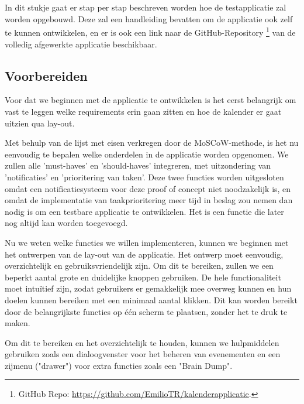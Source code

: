 \chapter{}%
\label{ch:proofofconcept}

In dit stukje gaat er stap per stap beschreven worden hoe de testapplicatie zal worden opgebouwd. Deze zal een handleiding bevatten om de applicatie ook zelf te kunnen ontwikkelen, en er is ook een link naar de GitHub-Repository \footnote{GitHub Repo: \url{https://github.com/EmilioTR/kalenderapplicatie}.} van de volledig afgewerkte applicatie beschikbaar.


\section{Voorbereiden}

Voor dat we beginnen met de applicatie te ontwikkelen is het eerst belangrijk om vast te leggen welke requirements erin gaan zitten en hoe de kalender er gaat uitzien qua lay-out. \newline

Met behulp van de lijst met eisen verkregen door de MoSCoW-methode, is het nu eenvoudig te bepalen welke onderdelen in de applicatie worden opgenomen. We zullen alle 'must-haves' en 'should-haves' integreren, met uitzondering van 'notificaties' en 'prioritering van taken'. Deze twee functies worden uitgesloten omdat een notificatiesysteem voor deze proof of concept niet noodzakelijk is, en omdat de implementatie van taakprioritering meer tijd in beslag zou nemen dan nodig is om een testbare applicatie te ontwikkelen. Het is een functie die later nog altijd kan worden toegevoegd.\newline

Nu we weten welke functies we willen implementeren, kunnen we beginnen met het ontwerpen van de lay-out van de applicatie. Het ontwerp moet eenvoudig, overzichtelijk en gebruiksvriendelijk zijn. Om dit te bereiken, zullen we een beperkt aantal grote en duidelijke knoppen gebruiken. De hele functionaliteit moet intuïtief zijn, zodat gebruikers er gemakkelijk mee overweg kunnen en hun doelen kunnen bereiken met een minimaal aantal klikken. Dit kan worden bereikt door de belangrijkste functies op één scherm te plaatsen, zonder het te druk te maken. \newline

Om dit te bereiken en het overzichtelijk te houden, kunnen we hulpmiddelen gebruiken zoals een dialoogvenster voor het beheren van evenementen en een zijmenu ("drawer") voor extra functies zoals een "Brain Dump".  \newline


